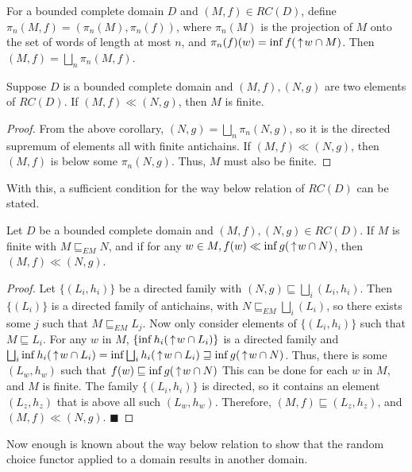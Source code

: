\begin{corollary} \label{projections}
For a bounded complete domain $D$ and $(M,f)\in RC(D)$, define $\pi_n(M,f) = (\pi_n(M), \pi_n(f))$, where $\pi_n(M)$ is the projection of $M$ onto the set of words of length at most $n$, and $\pi_n(f)(w) = \inf f(\,\uparrow\! w \cap M)$.  Then $(M,f) = \bigsqcup_{n} \pi_n(M,f)$.
\end{corollary}

\begin{corollary}
Suppose $D$ is a bounded complete domain and $(M,f), (N,g)$ are two elements of $RC(D)$.  If $(M,f) \ll (N,g)$, then $M$ is finite.
\end{corollary}
\begin{proof}
From the above corollary, $(N,g) = \bigsqcup_{n} \pi_n(N,g)$, so it is the directed supremum of elements all with finite antichains.  If $(M,f) \ll (N,g)$, then $(M,f)$ is below some $\pi_n(N,g)$.  Thus, $M$ must also be finite.
\end{proof}
With this, a sufficient condition for the way below relation of $RC(D)$ can be stated.

\begin{proposition}
Let $D$ be a bounded complete domain and $(M,f), (N,g)\in RC(D)$.  If $M$ is finite with $M\sqsubseteq_{EM} N$, and if for any $w\in M, f(w)\ll \inf g(\,\uparrow\! w \cap N)$, then $(M,f)\ll (N,g)$.
\end{proposition}
\begin{proof}
Let $\{(L_i, h_i)\}$ be a directed family with $(N,g)\sqsubseteq \bigsqcup_{i} (L_i, h_i)$.  Then $\{(L_i)\}$ is a directed family of antichains, with $N \sqsubseteq_{EM} \bigsqcup_{i}(L_i)$, so there exists some $j$ such that $M \sqsubseteq_{EM} L_j$.  Now only consider elements of $\{(L_i, h_i)\}$ such that $M \sqsubseteq L_i$.  For any $w$ in $M$, $\{\inf h_i(\,\uparrow\! w \cap L_i)\}$ is a directed family and $\bigsqcup_{i} \inf h_i(\,\uparrow\! w \cap L_i) = \inf \bigsqcup_{i} h_i(\,\uparrow\! w \cap L_i) \sqsupseteq \inf g(\,\uparrow\! w \cap N)$.  Thus, there is some $(L_w, h_w)$ such that $f(w) \sqsubseteq \inf g(\,\uparrow\! w \cap N)$  This can be done for each $w$ in $M$, and $M$ is finite.  The family $\{(L_i, h_i)\}$ is directed, so it contains an element $(L_z, h_z)$ that is above all such $(L_w, h_w)$.  Therefore, $(M,f) \sqsubseteq (L_z, h_z)$, and $(M,f) \ll (N,g)$.
\hfill $\blacksquare$
\end{proof}
Now enough is known about the way below relation to show that the random choice functor applied to a domain results in another domain.

